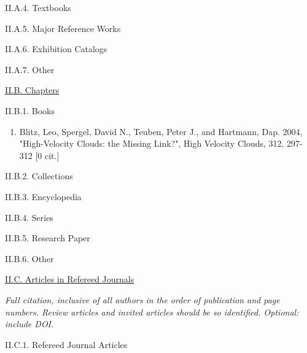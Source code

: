 \documentclass[11pt,letterpaper]{article}
\begin{document}
II.A.4. Textbooks

II.A.5. Major Reference Works

II.A.6. Exhibition Catalogs

II.A.7. Other


\underline{II.B. Chapters}

II.B.1. Books

\begin{enumerate}[resume,label=\textbf{\arabic*}.]  
\item
Blitz, Leo, Spergel, David N., Teuben, Peter J., and Hartmann, Dap.  2004,  
"High-Velocity Clouds: the Missing Link?", High Velocity Clouds,  312,  
297-312 [0 cit.] 
\end{enumerate}

II.B.2. Collections

II.B.3. Encyclopedia

II.B.4. Series

II.B.5. Research Paper

II.B.6. Other


\underline{II.C. Articles in Refereed Journals}

\textit{Full citation, inclusive of all authors in the order of publication and page numbers. Review articles and invited articles should be so identified. Optional: include DOI.}

II.C.1. Refereed Journal Articles

\end{document}
